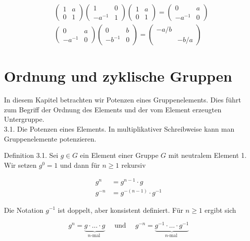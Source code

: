 \documentclass[10pt, letterpaper]{article}
\begin{document}
$$
\begin{aligned}
& \left(\begin{array}{ll}
1 & a \\
0 & 1
\end{array}\right)\left(\begin{array}{cc}
1 & 0 \\
-a^{-1} & 1
\end{array}\right)\left(\begin{array}{ll}
1 & a \\
0 & 1
\end{array}\right)=\left(\begin{array}{cc}
0 & a \\
-a^{-1} & 0
\end{array}\right) \\
& \left(\begin{array}{cc}
0 & a \\
-a^{-1} & 0
\end{array}\right)\left(\begin{array}{cc}
0 & b \\
-b^{-1} & 0
\end{array}\right)=\left(\begin{array}{cc}
-a / b & \\
& -b / a
\end{array}\right)
\end{aligned}
$$

\section*{Ordnung und zyklische Gruppen}
In diesem Kapitel betrachten wir Potenzen eines Gruppenelements. Dies führt zum Begriff der Ordnung des Elements und der vom Element erzeugten Untergruppe.\\
3.1. Die Potenzen eines Elements. In multiplikativer Schreibweise kann man Gruppenelemente potenzieren.

Definition 3.1. Sei $g \in G$ ein Element einer Gruppe $G$ mit neutralem Element 1. Wir setzen $g^{0}=1$ und dann für $n \geq 1$ rekursiv

$$
\begin{aligned}
g^{n} & =g^{n-1} \cdot g \\
g^{-n} & =g^{-(n-1)} \cdot g^{-1}
\end{aligned}
$$

Die Notation $g^{-1}$ ist doppelt, aber konsistent definiert. Für $n \geq 1$ ergibt sich

$$
g^{n}=\underbrace{g \cdot \ldots \cdot g}_{n \text {-mal }} \quad \text { und } \quad g^{-n}=\underbrace{g^{-1} \cdot \ldots \cdot g^{-1}}_{n \text {-mal }}
$$
\end{document}
